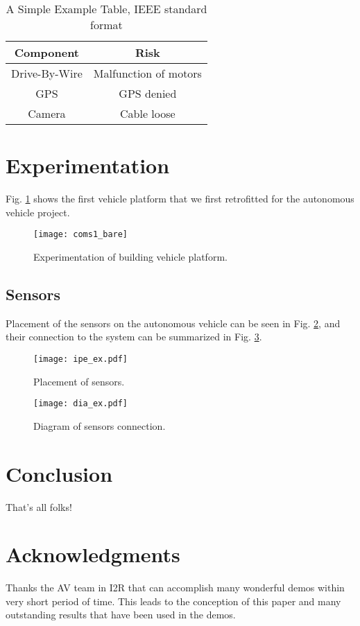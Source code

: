 \documentclass[10 pt,letterpaper,conference]{IEEEtran}
\begin{document}
\begin{table}[!t]
\renewcommand{\arraystretch}{1.3}
\caption{A Simple Example Table, IEEE standard format}
\label{table_example}
\centering
\begin{tabular}{c||c}
\hline\bfseries Component & \bfseries Risk\\
\hline
\hline Drive-By-Wire & Malfunction of motors\\
\hline
\hline GPS & GPS denied\\
\hline
\hline Camera & Cable loose\\
\hline
\end{tabular}
\end{table}

\section{Experimentation}\label{experimentation}

Fig. \ref{coms1_bare} shows the first vehicle platform that we first
retrofitted for the autonomous vehicle project.

\begin{figure}[!t]
\centering
\texttt{[image: coms1\_bare]}
\caption{Experimentation of building vehicle platform.}
\label{coms1_bare}
\end{figure}

\subsection{Sensors}\label{sensors}

Placement of the sensors on the autonomous vehicle can be seen in Fig.
\ref{ipe_ex}, and their connection to the system can be summarized in
Fig. \ref{dia_ex}.

\begin{figure}[!t]
\centering
\texttt{[image: ipe\_ex.pdf]}
\caption{Placement of sensors.}
\label{ipe_ex}
\end{figure}

\begin{figure}[!t]
\centering
\texttt{[image: dia\_ex.pdf]}
\caption{Diagram of sensors connection.}
\label{dia_ex}
\end{figure}

\section{Conclusion}\label{conclusion}

That's all folks!

\section*{Acknowledgments}\label{acknowledgments}

Thanks the AV team in I2R that can accomplish many wonderful demos
within very short period of time. This leads to the conception of this
paper and many outstanding results that have been used in the demos.

                                    \renewcommand\refname{References}
                        

    
\end{document}
